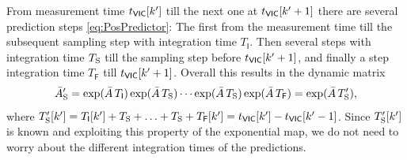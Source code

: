 From measurement time $t_{\mathsf{VIC}}[k']$ till the next one at $t_{\mathsf{VIC}}[k'+1]$ there are several prediction steps \eqref{eq:PosPredictor}:
The first from the measurement time till the subsequent sampling step with integration time $T_\mathsf{I}$.
Then several steps with integration time $T_{\mathrm{S}}$ till the sampling step before $t_{\mathsf{VIC}}[k'+1]$, and finally a step integration time $T_\mathsf{F}$ till $t_{\mathsf{VIC}}[k'+1]$.
Overall this results in the dynamic matrix 
\begin{align}
 \bar{A}'_{\mathrm{S}} = \exp(\bar{A}\,T_\mathsf{I}) \exp(\bar{A}\,T_{\mathrm{S}}) \cdots \exp(\bar{A}\,T_{\mathrm{S}}) \exp(\bar{A}\,T_\mathsf{F}) = \exp(\bar{A}\,T'_{\mathrm{S}}), 
\end{align}
where $T'_{\mathrm{S}}[k'] = T_\mathsf{I}[k'] + T_{\mathrm{S}} + \ldots + T_{\mathrm{S}} + T_\mathsf{F}[k'] = t_{\mathsf{VIC}}[k'] - t_{\mathsf{VIC}}[k'-1]$.
Since $T'_{\mathrm{S}}[k']$ is known and exploiting this property of the exponential map, we do not need to worry about the different integration times of the predictions.

